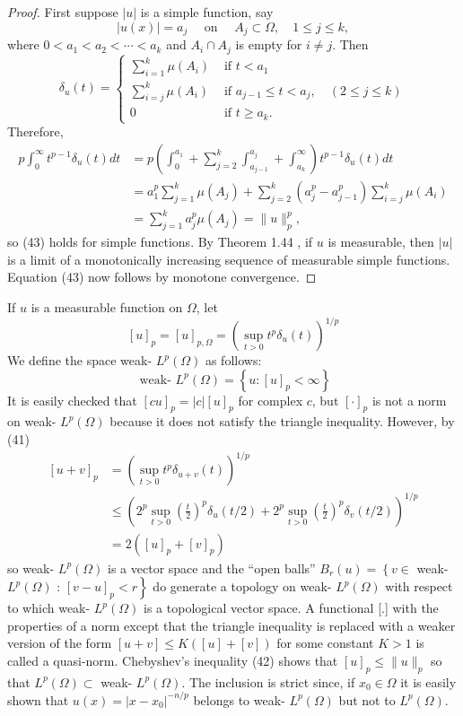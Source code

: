 \begin{proof}
  First suppose $|u|$ is a simple function, say
  \[
  |u(x)|=a_j \quad \text { on } \quad A_j \subset \Omega, \quad 1 \leq j \leq k,
  \]
  where $0<a_1<a_2<\cdots<a_k$ and $A_i \cap A_j$ is empty for $i \neq j$. Then
  \[
  \delta_u(t)= \begin{cases}\sum_{i=1}^k \mu\left(A_i\right) & \text { if } t<a_1 \\ \sum_{i=j}^k \mu\left(A_i\right) & \text { if } a_{j-1} \leq t<a_j, \quad(2 \leq j \leq k) \\ 0 & \text { if } t \geq a_k .\end{cases}
  \]
  Therefore,
  \[
  \begin{aligned}
  p \int_0^{\infty} t^{p-1} \delta_u(t) d t & =p\left(\int_0^{a_1}+\sum_{j=2}^k \int_{a_{j-1}}^{a_j}+\int_{a_k}^{\infty}\right) t^{p-1} \delta_u(t) d t \\
  & =a_1^p \sum_{j=1}^k \mu\left(A_j\right)+\sum_{j=2}^k\left(a_j^p-a_{j-1}^p\right) \sum_{i=j}^k \mu\left(A_i\right) \\
  & =\sum_{j=1}^k a_j^p \mu\left(A_j\right)=\|u\|_p^p,
  \end{aligned}
  \]
  so (43) holds for simple functions. By Theorem 1.44 , if $u$ is measurable, then $|u|$ is a limit of a monotonically increasing sequence of measurable simple functions. Equation (43) now follows by monotone convergence.
\end{proof}


\begin{para}
  If $u$ is a measurable function on $\Omega$, let
  \[
  [u]_p=[u]_{p, \Omega}=\left(\sup _{t>0} t^p \delta_u(t)\right)^{1 / p}
  \]
  We define the space weak- $L^p(\Omega)$ as follows:
  \[
  \text { weak- } L^p(\Omega)=\left\{u:[u]_p<\infty\right\}
  \]
  It is easily checked that $[c u]_p=|c|[u]_p$ for complex $c$, but $[\cdot]_p$ is not a norm on weak- $L^p(\Omega)$ because it does not satisfy the triangle inequality. However, by (41)
  \[
  \begin{aligned}
  {[u+v]_p } & =\left(\sup _{t>0} t^p \delta_{u+v}(t)\right)^{1 / p} \\
  & \leq\left(2^p \sup _{t>0}\left(\frac{t}{2}\right)^p \delta_u(t / 2)+2^p \sup _{t>0}\left(\frac{t}{2}\right)^p \delta_v(t / 2)\right)^{1 / p} \\
  & =2\left([u]_p+[v]_p\right)
  \end{aligned}
  \]
  so weak- $L^p(\Omega)$ is a vector space and the ``open balls'' $B_r(u)=\left\{v \in\right.$ weak- $L^p(\Omega)$ : $\left.[v-u]_p<r\right\}$ do generate a topology on weak- $L^p(\Omega)$ with respect to which weak- $L^p(\Omega)$ is a topological vector space. A functional [.] with the properties of a norm except that the triangle inequality is replaced with a weaker version of the form $[u+v] \leq K([u]+[v])$ for some constant $K>1$ is called a quasi-norm.
  Chebyshev's inequality (42) shows that $[u]_p \leq\|u\|_p$ so that $L^p(\Omega) \subset$ weak- $L^p(\Omega)$. The inclusion is strict since, if $x_0 \in \Omega$ it is easily shown that $u(x)=\left|x-x_0\right|^{-n / p}$ belongs to weak- $L^p(\Omega)$ but not to $L^p(\Omega)$.
\end{para}

